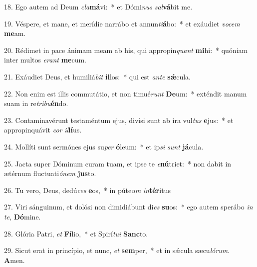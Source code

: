 18. Ego autem ad Deum \textit{cla}\textbf{má}vi:~*  et Dómi\textit{nus} \textit{sal}\textbf{vá}bit me.\

19. Véspere, et mane, et merídie narrábo et annun\textit{ti}\textbf{á}bo:~*  et exáudiet \textit{vo}\textit{cem} \textbf{me}am.\

20. Rédimet in pace ánimam meam ab his, qui appropín\textit{quant} \textbf{mi}hi:~*  quóniam inter multos \textit{e}\textit{rant} \textbf{me}cum.\

21. Exáudiet Deus, et humiliá\textit{bit} \textbf{il}los:~*  qui est \textit{an}\textit{te} \textbf{sǽ}cula.\

22. Non enim est illis commutátio, et non timué\textit{runt} \textbf{De}um:~*  exténdit manum suam in re\textit{tri}\textit{bu}\textbf{én}do.\

23. Contaminavérunt testaméntum ejus, divísi sunt ab ira vul\textit{tus} \textbf{e}jus:~*  et appropinquávit \textit{cor} \textit{il}\textbf{lí}us.\

24. Mollíti sunt sermónes ejus su\textit{per} \textbf{ó}leum:~*  et ip\textit{si} \textit{sunt} \textbf{já}cula.\

25. Jacta super Dóminum curam tuam, et ipse te \textit{e}\textbf{nú}triet:~*  non dabit in ætérnum fluctuati\textit{ó}\textit{nem} \textbf{jus}to.\

26. Tu vero, Deus, dedú\textit{ces} \textbf{e}os,~*  in púte\textit{um} \textit{in}\textbf{tér}itus\

27. Viri sánguinum, et dolósi non dimidiábunt di\textit{es} \textbf{su}os:~*  ego autem sperábo \textit{in} \textit{te}, \textbf{Dó}mine.\

28. Glória Patri, \textit{et} \textbf{Fí}lio,~*  et Spirí\textit{tu}\textit{i} \textbf{Sanc}to.\

29. Sicut erat in princípio, et nunc, \textit{et} \textbf{sem}per,~*  et in sǽcula sæcu\textit{ló}\textit{rum}. \textbf{A}men.\

